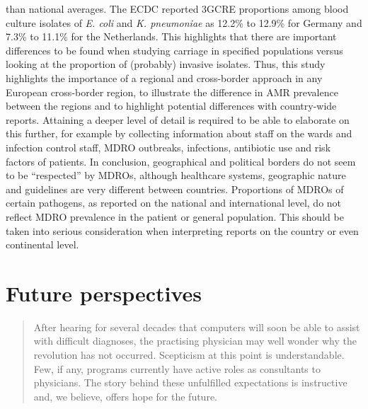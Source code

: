 \documentclass[
]{book}
\begin{document}
than national averages. The ECDC reported 3GCRE proportions among blood culture isolates of \emph{E. coli} and \emph{K. pneumoniae} as 12.2\% to 12.9\% for Germany and 7.3\% to 11.1\% for the Netherlands. This highlights that there are important differences to be found when studying carriage in specified populations versus looking at the proportion of (probably) invasive isolates. Thus, this study highlights the importance of a regional and cross-border approach in any European cross-border region, to illustrate the difference in AMR prevalence between the regions and to highlight potential differences with country-wide reports. Attaining a deeper level of detail is required to be able to elaborate on this further, for example by collecting information about staff on the wards and infection control staff, MDRO outbreaks, infections, antibiotic use and risk factors of patients. In conclusion, geographical and political borders do not seem to be ``respected'' by MDROs, although healthcare systems, geographic nature and guidelines are very different between countries. Proportions of MDROs of certain pathogens, as reported on the national and international level, do not reflect MDRO prevalence in the patient or general population. This should be taken into serious consideration when interpreting reports on the country or even continental level.

\hypertarget{future-perspectives}{%
\section*{Future perspectives}\label{future-perspectives}}

\begin{quote}
After hearing for several decades that computers will soon be able to assist with difficult diagnoses, the practising physician may well wonder why the revolution has not occurred. Scepticism at this point is understandable. Few, if any, programs currently have active roles as consultants to physicians. The story behind these unfulfilled expectations is instructive and, we believe, offers hope for the future.
\end{quote}
\end{document}
